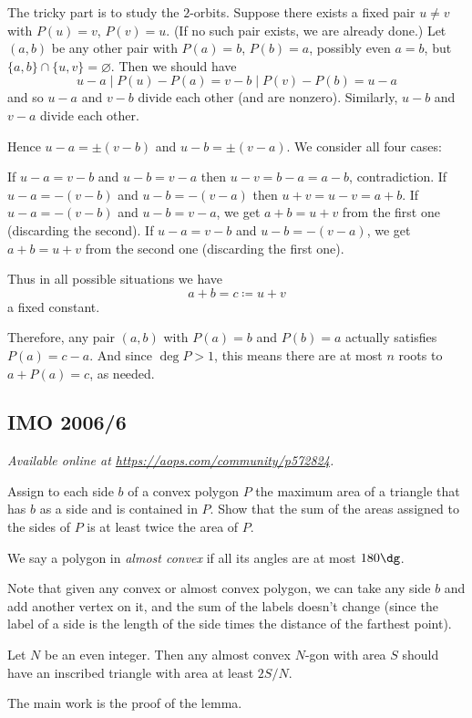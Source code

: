 \documentclass[11pt]{scrartcl}
\begin{document}
The tricky part is to study the $2$-orbits.
Suppose there exists a fixed pair $u \neq v$
with $P(u) = v$, $P(v) = u$.
(If no such pair exists, we are already done.)
Let $(a,b)$ be any other pair with $P(a) = b$, $P(b) = a$,
possibly even $a = b$, but $\{a,b\} \cap \{u,v\} = \varnothing$.
Then we should have
\[ u-a \mid P(u)-P(a) = v-b
  \mid P(v) - P(b) = u-a \]
and so $u-a$ and $v-b$ divide each other (and are nonzero).
Similarly, $u-b$ and $v-a$ divide each other.

Hence $u-a = \pm (v-b)$ and $u-b = \pm (v-a)$.
We consider all four cases:
\begin{itemize}
  \ii If $u-a = v-b$ and $u-b = v-a$
  then $u-v = b-a = a-b$, contradiction.
  \ii If $u-a = -(v-b)$ and $u-b = -(v-a)$
  then $u+v = u-v = a+b$.
  \ii If $u-a = -(v-b)$ and $u-b = v-a$,
  we get $a+b = u+v$ from the first one
  (discarding the second).
  \ii If $u-a = v-b$ and $u-b = -(v-a)$,
  we get $a+b = u+v$ from the second one
  (discarding the first one).
\end{itemize}
Thus in all possible situations we have
\[ a+b = c \coloneqq u+v \]
a fixed constant.

Therefore, any pair $(a,b)$ with $P(a) = b$
and $P(b) = a$ actually satisfies $P(a) = c-a$.
And since $\deg P > 1$,
this means there are at most $n$ roots to $a+P(a)=c$, as needed.
\pagebreak

\subsection{IMO 2006/6}
\textsl{Available online at \url{https://aops.com/community/p572824}.}
\begin{mdframed}[style=mdpurplebox,frametitle={Problem statement}]
Assign to each side $b$ of a convex polygon $P$
the maximum area of a triangle that has $b$
as a side and is contained in $P$.
Show that the sum of the areas assigned
to the sides of $P$ is at least twice the area of $P$.
\end{mdframed}
We say a polygon in \emph{almost convex}
if all its angles are at most $180\dg$.

Note that given any convex or almost convex polygon,
we can take any side $b$ and add another vertex on it,
and the sum of the labels doesn't change
(since the label of a side is the length of the side
times the distance of the farthest point).

\begin{lemma*}
  Let $N$ be an even integer.
  Then any almost convex $N$-gon with area $S$
  should have an inscribed triangle with area at least $2S/N$.
\end{lemma*}
The main work is the proof of the lemma.
\end{document}
